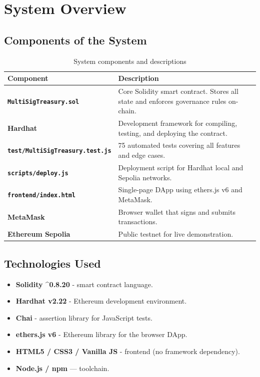 \documentclass[12pt,a4paper]{article}
\begin{document}
\section{System Overview}

\subsection{Components of the System}

\begin{table}[h]
  \centering
  \begin{tabularx}{\linewidth}{>{\bfseries}lX}
    \toprule
    Component & Description \\
    \midrule
    \texttt{MultiSigTreasury.sol} & Core Solidity smart contract. Stores all state and enforces governance rules on-chain. \\
    Hardhat & Development framework for compiling, testing, and deploying the contract. \\
    \texttt{test/MultiSigTreasury.test.js} & 75 automated tests covering all features and edge cases. \\
    \texttt{scripts/deploy.js} & Deployment script for Hardhat local and Sepolia networks. \\
    \texttt{frontend/index.html} & Single-page DApp using ethers.js v6 and MetaMask. \\
    MetaMask & Browser wallet that signs and submits transactions. \\
    Ethereum Sepolia & Public testnet for live demonstration. \\
    \bottomrule
  \end{tabularx}
  \caption{System components and descriptions}
\end{table}

\subsection{Technologies Used}

\begin{itemize}
  \item \textbf{Solidity \textasciicircum 0.8.20} - smart contract language.
  \item \textbf{Hardhat v2.22} - Ethereum development environment.
  \item \textbf{Chai} - assertion library for JavaScript tests.
  \item \textbf{ethers.js v6} - Ethereum library for the browser DApp.
  \item \textbf{HTML5 / CSS3 / Vanilla JS} - frontend (no framework dependency).
  \item \textbf{Node.js / npm} — toolchain.
\end{itemize}
\end{document}
